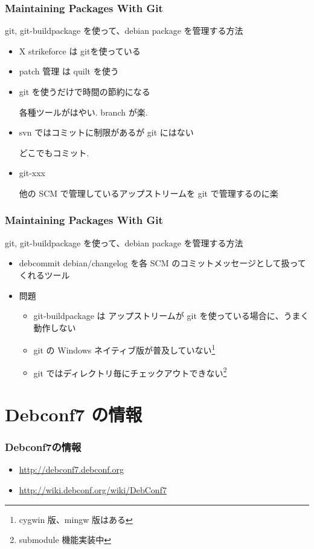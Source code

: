 \documentclass[cjk,dvipdfmx,12pt]{beamer}
\begin{document}
\begin{frame} 
\frametitle{Maintaining Packages With Git}
  git, git-buildpackage を使って、debian package を管理する方法
	
  \begin{itemize}
    \item X strikeforce は gitを使っている
    \item patch 管理 は quilt を使う
    \item git を使うだけで時間の節約になる
    
	各種ツールがはやい. branch が楽.

    \item svn ではコミットに制限があるが git にはない

	どこでもコミット.

    \item git-xxx

	他の SCM で管理しているアップストリームを git で管理するのに楽

	
  \end{itemize}
\end{frame}


\begin{frame} 
\frametitle{Maintaining Packages With Git}
  git, git-buildpackage を使って、debian package を管理する方法
	
  \begin{itemize}
    \item debcommit
	debian/changelog を各 SCM のコミットメッセージとして扱ってくれるツール

    \item 問題
      \begin{itemize}
	 \item git-buildpackage は
	       アップストリームが git を使っている場合に、うまく動作しない
	 \item git の Windows ネイティブ版が普及していない\footnote{
	       cygwin 版、mingw 版はある }
         \item git ではディレクトリ毎にチェックアウトできない\footnote{submodule
	       機能実装中}
      \end{itemize}
  \end{itemize}
 
\end{frame}


\section{Debconf7 の情報}
\begin{frame} 
\frametitle{Debconf7の情報 }
\begin{itemize}
    \item \url{http://debconf7.debconf.org}
    \item \url{http://wiki.debconf.org/wiki/DebConf7}
  \end{itemize}
\end{frame}
\end{document}
